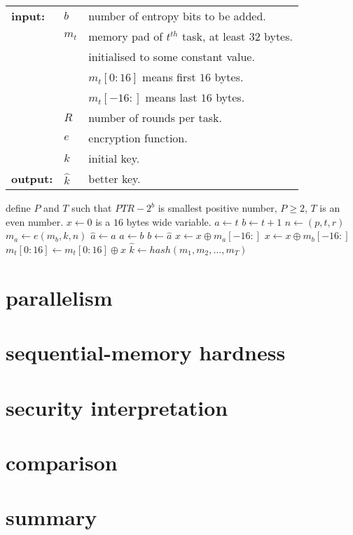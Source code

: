 \documentclass[twocolumn]{article}
\begin{document}
\begin{tabular}{lll}
    \textbf{input:}  & $b$ & number of entropy bits to be added.\\
            & $m_t$ & memory pad of $t^{th}$ task, at least $32$ bytes.\\
            &       & initialised to some constant value.\\
            &       & $m_t[0:16]$ means first $16$ bytes.\\
            &       & $m_t[-16:]$ means last $16$ bytes.\\
            & $R$ & number of rounds per task.\\
            & $e$ & encryption function.\\
            & $k$ & initial key.\\
    \textbf{output:} & $\hat k$ & better key.\\
\end{tabular}
\begin{algorithmic}[1]
    \STATE define $P$ and $T$ such that $PTR - 2^b$ is smallest positive
    number, $P \ge 2$, $T$ is an even number.
    \STATE $x \leftarrow 0$ is a $16$ bytes wide variable.
            \STATE $a \leftarrow t$
            \STATE $b \leftarrow t+1$
                \STATE $n \leftarrow (p, t, r)$
                \STATE $m_a \leftarrow e(m_b, k, n)$
                \STATE $\hat a \leftarrow a$
                \STATE $a \leftarrow b$
                \STATE $b \leftarrow \hat a$
            \ENDFOR
            \STATE $x \leftarrow x \oplus m_a[-16:]$
            \STATE $x \leftarrow x \oplus m_b[-16:]$
        \ENDFOR
            \STATE $m_t[0:16] \leftarrow m_t[0:16] \oplus x$
        \ENDFOR
    \ENDFOR
    \RETURN $\hat k \leftarrow hash(m_1, m_2, \ldots, m_T)$
\end{algorithmic}

\section{parallelism}
\section{sequential-memory hardness}
\section{security interpretation}
\section{comparison}
\section{summary}
\end{document}
